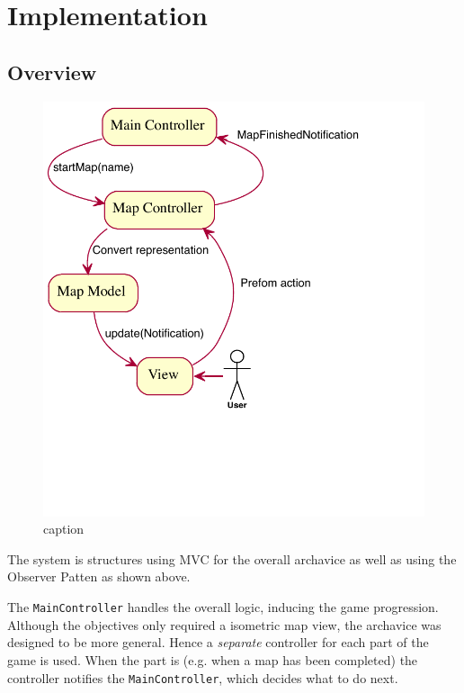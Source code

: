 
\section{Implementation}

\subsection{Overview}

\begin{figure}[htbp]
	\centering
		\includegraphics{figures/engine_exported.pdf}
	\caption{caption}
	\label{fig:Overview of the engine}
\end{figure}

The system is structures using MVC for the overall archavice as well as  using the Observer Patten as shown  above.


The \texttt{MainController} handles the overall logic, inducing the game progression. 
Although the objectives only required a isometric  map view, the archavice was designed to be more general. Hence a \emph{separate} controller for each part of the game is used. When the part is  (e.g. when a map has been completed) the controller notifies the \texttt{MainController}, which decides what to do next.   

